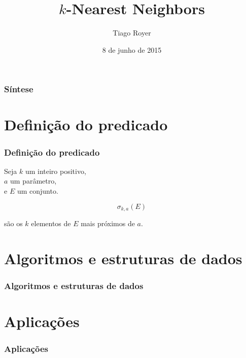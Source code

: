 \documentclass[utf8]{beamer}
\begin{document}
\author{Tiago Royer}
\title{$k$-Nearest Neighbors}
\date{8 de junho de 2015}
\begin{frame}
    \titlepage
\end{frame}

\begin{frame}
    \frametitle{Síntese}
    \tableofcontents
\end{frame}

\section{Definição do predicado}

\begin{frame}
    \frametitle{Definição do predicado}

    Seja $k$ um inteiro positivo,\\
    $a$ um parâmetro,\\
    e $E$ um conjunto.

    \begin{equation*}
        \sigma_{k, a}(E)
    \end{equation*}

    são os $k$ elementos de $E$ mais próximos de $a$.
\end{frame}

\section{Algoritmos e estruturas de dados}

\begin{frame}
    \frametitle{Algoritmos e estruturas de dados}
\end{frame}

\section{Aplicações}
\begin{frame}
    \frametitle{Aplicações}
\end{frame}
\end{document}
